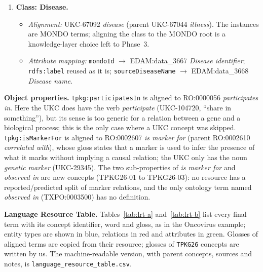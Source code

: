 \begin{enumerate}
\begin{itemize}
    \end{itemize}
    \item \textbf{Class: Disease.}
    \begin{itemize}
        \item \emph{Alignment:} UKC-67092 \emph{disease} (parent UKC-67044 \emph{illness}). The instances are MONDO terms; aligning the class to the MONDO root is a knowledge-layer choice left to Phase~3.
        \item \emph{Attribute mapping:} \texttt{mondoId} $\rightarrow$ EDAM:data\_3667 \emph{Disease identifier}; \texttt{rdfs:label} reused as it is; \texttt{sourceDiseaseName} $\rightarrow$ EDAM:data\_3668 \emph{Disease name}.
    \end{itemize}
\end{enumerate}

\noindent\textbf{Object properties.} \texttt{tpkg:participatesIn} is aligned to RO:0000056 \emph{participates in}. Here the UKC does have the verb \emph{participate} (UKC-104720, ``share in something''), but its sense is too generic for a relation between a gene and a biological process; this is the only case where a UKC concept was skipped. \texttt{tpkg:isMarkerFor} is aligned to RO:0002607 \emph{is marker for} (parent RO:0002610 \emph{correlated with}), whose gloss states that a marker is used to infer the presence of what it marks without implying a causal relation; the UKC only has the noun \emph{genetic marker} (UKC-29345). The two sub-properties of \emph{is marker for} and \emph{observed in} are new concepts (TPKG26-01 to TPKG26-03): no resource has a reported/predicted split of marker relations, and the only ontology term named \emph{observed in} (TXPO:0003500) has no definition.

\noindent\textbf{Language Resource Table.} Tables~\ref{tab:lrt-a} and~\ref{tab:lrt-b} list every final term with its concept identifier, word and gloss, as in the Oncovirus example; entity types are shown in blue, relations in red and attributes in green. Glosses of aligned terms are copied from their resource; glosses of \texttt{TPKG26} concepts are written by us. The machine-readable version, with parent concepts, sources and notes, is \texttt{language\_resource\_table.csv}.

